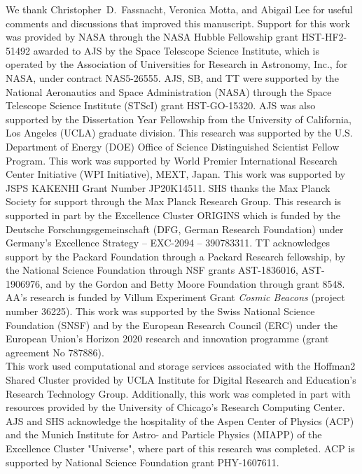 \documentclass[longauth]{aa}
\newcommand{\suyu}[1]{{{#1}}}
\begin{document}
\begin{acknowledgements}
%
We thank Christopher~D.~Fassnacht, Veronica Motta, and Abigail Lee for useful comments and discussions that improved this manuscript.
%
Support for this work was provided by NASA through the NASA Hubble Fellowship grant
HST-HF2-51492 awarded to AJS by the Space Telescope Science Institute, which is operated by the Association of Universities for Research in Astronomy, Inc., for NASA, under contract NAS5-26555.
%
AJS, SB, and TT were supported by the National Aeronautics and Space Administration (NASA) through the Space Telescope Science Institute (STScI) grant HST-GO-15320. AJS was also supported by the Dissertation Year Fellowship from the University of California, Los Angeles (UCLA) graduate division. This research was supported by the U.S. Department of Energy (DOE) Office of Science Distinguished Scientist Fellow Program. 
%
This work was supported by World Premier International Research Center Initiative (WPI Initiative), MEXT, Japan. This work was supported by JSPS KAKENHI Grant Number JP20K14511.
%
SHS thanks the Max Planck Society for support through the Max Planck Research Group.
This research is supported in part by the Excellence Cluster ORIGINS which is funded by the Deutsche Forschungsgemeinschaft (DFG, German Research Foundation) under Germany's Excellence Strategy -- EXC-2094 -- 390783311.
%
TT acknowledges support by the Packard Foundation through a Packard Research fellowship, by the National Science Foundation through NSF grants AST-1836016, AST-1906976, and by the Gordon and Betty Moore Foundation through grant 8548.
AA’s research is funded by Villum Experiment Grant \textit{Cosmic Beacons} (project number 36225).
This work was supported by the Swiss National Science Foundation (SNSF) and by the European Research Council (ERC) under the European Union’s Horizon 2020 research and innovation programme (grant agreement No 787886). 
\\
This work used computational and storage services associated with the Hoffman2 Shared Cluster provided by UCLA Institute for Digital Research and Education’s Research Technology Group. Additionally, this work was completed in part with resources provided by the University of Chicago’s Research Computing Center.
\\
AJS \suyu{and SHS} acknowledge the hospitality of the Aspen Center of Physics (ACP) and the Munich Institute for Astro- and Particle Physics (MIAPP) of the Excellence Cluster "Universe", where part of this research was completed. ACP is supported by National Science Foundation grant PHY-1607611.

\end{acknowledgements}
\end{document}
